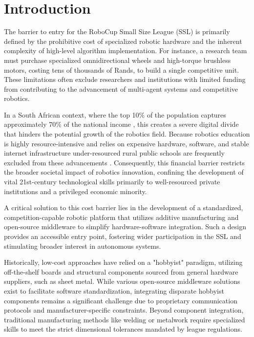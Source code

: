 \documentclass[a4paper,twoside,12pt]{report}
\begin{document}
\chapter{Introduction} \label{chapter: introduction}

The barrier to entry for the RoboCup Small Size League (SSL) is primarily defined by the prohibitive cost of specialized robotic hardware and the inherent complexity of high-level algorithm implementation. For instance, a research team must purchase specialized omnidirectional wheels and high-torque brushless motors, costing tens of thousands of Rands, to build a single competitive unit. These limitations often exclude researchers and institutions with limited funding from contributing to the advancement of multi-agent systems and competitive robotics.

In a South African context, where the top 10\% of the population captures approximately 70\% of the national income \citep{czajka2026thirty}, this creates a severe digital divide that hinders the potential growth of the robotics field. Because robotics education is highly resource-intensive and relies on expensive hardware, software, and stable internet infrastructure under-resourced rural public schools are frequently excluded from these advancements \citep{mapheto2023teachers}. Consequently, this financial barrier restricts the broader societal impact of robotics innovation, confining the development of vital 21st-century technological skills primarily to well-resourced private institutions and a privileged economic minority.

A critical solution to this cost barrier lies in the development of a standardized, competition-capable robotic platform that utilizes additive manufacturing and open-source middleware to simplify hardware-software integration. Such a design provides an accessible entry point, fostering wider participation in the SSL and stimulating broader interest in autonomous systems.

Historically, low-cost approaches have relied on a "hobbyist" paradigm, utilizing off-the-shelf boards and structural components sourced from general hardware suppliers, such as sheet metal. While various open-source middleware solutions exist to facilitate software standardization, integrating disparate hobbyist components remains a significant challenge due to proprietary communication protocols and manufacturer-specific constraints. Beyond component integration, traditional manufacturing methods like welding or metalwork require specialized skills to meet the strict dimensional tolerances mandated by league regulations.
\end{document}
